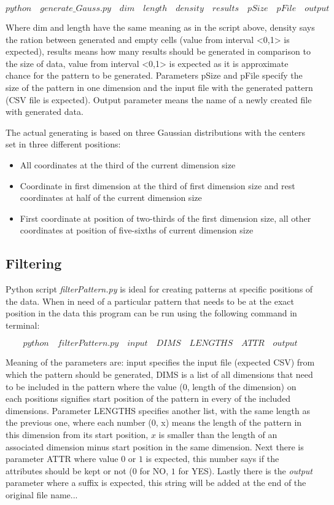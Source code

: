 $$python\quad generate\_Gauss.py\quad dim\quad length\quad density\quad results\quad pSize\quad pFile\quad output$$ 

Where dim and length have the same meaning as in the script above, density says the ration between generated and empty cells (value from interval <0,1> is expected), results means how many results should be generated in comparison to the size of data, value from interval <0,1> is expected as it is approximate chance for the pattern to be generated. Parameters pSize and pFile specify the size of the pattern in one dimension and the input file with the generated pattern (CSV file is expected). Output parameter means the name of a newly created file with generated data.

The actual generating is based on three Gaussian distributions with the centers set in three different positions:
\begin{itemize}
\item All coordinates at the third of the current dimension size
\item Coordinate in first dimension at the third of first dimension size and rest coordinates at half of the current dimension size
\item First coordinate at position of two-thirds of the first dimension size, all other coordinates at position of five-sixths of current dimension size
\end{itemize}

\subsection{Filtering}
Python script \textit{filterPattern.py} is ideal for creating patterns at specific positions of the data. When in need of a particular pattern that needs to be at the exact position in the data this program can be run using the following command in terminal:

$$python\quad filterPattern.py\quad input\quad DIMS\quad LENGTHS\quad ATTR\quad output$$

Meaning of the parameters are: input specifies the input file (expected CSV) from which the pattern should be generated, DIMS is a list of all dimensions that need to be included in the pattern where the value (0, length of the dimension) on each positions signifies start position of the pattern in every of the included dimensions. Parameter LENGTHS specifies another list, with the same length as the previous one, where each number (0, x) means the length of the pattern in this dimension from its start position, $x$ is smaller than the length of an associated dimension minus start position in the same dimension. Next there is parameter ATTR where value $0$ or $1$ is expected, this number says if the attributes should be kept or not ($0$ for NO, $1$ for YES). Lastly there is the \textit{output} parameter where a suffix is expected, this string will be added at the end of the original file name...

